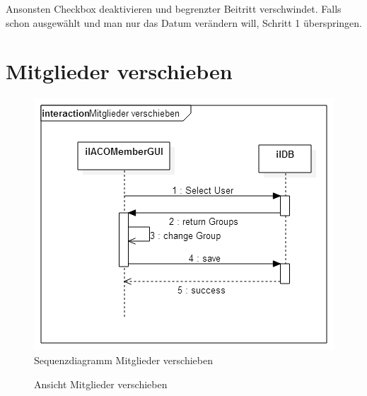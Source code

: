 Ansonsten Checkbox deaktivieren und begrenzter Beitritt verschwindet. 
Falls schon ausgewählt und man nur das Datum verändern will, Schritt 1 überspringen. 


\clearpage

\section{Mitglieder verschieben}
\begin{figure}[h!]
	\centering
	\includegraphics[width=.45\textwidth]{img/seq_memberGUI.png}
	\caption{Sequenzdiagramm Mitglieder verschieben}
\end{figure}

\begin{figure}[!ht]
	\centering
	\hfill
	\caption{Ansicht Mitglieder verschieben}

\end{figure}

